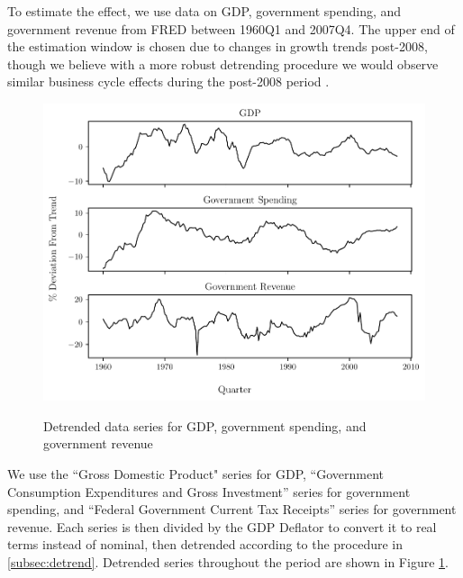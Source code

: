 To estimate the effect, we use data on GDP, government spending, and government revenue from FRED between 1960Q1 and 2007Q4. The upper end of the estimation window is chosen due to changes in growth trends post-2008, though we believe with a more robust detrending procedure we would observe similar business cycle effects during the post-2008 period \parencite{benigno2018stagnation}.

\begin{figure}[t!]
    \centering
    \caption{Detrended data series for GDP, government spending, and government revenue}
    \includegraphics{figures/detrended_data.pdf}
    \label{fig:dta}
\end{figure}

We use the ``Gross Domestic Product" series for GDP, ``Government Consumption Expenditures and Gross Investment'' series for government spending, and ``Federal Government Current Tax Receipts'' series for government revenue. Each series is then divided by the GDP Deflator to convert it to real terms instead of nominal, then detrended according to the procedure in \ref{subsec:detrend}. Detrended series throughout the period are shown in Figure \ref{fig:dta}.
